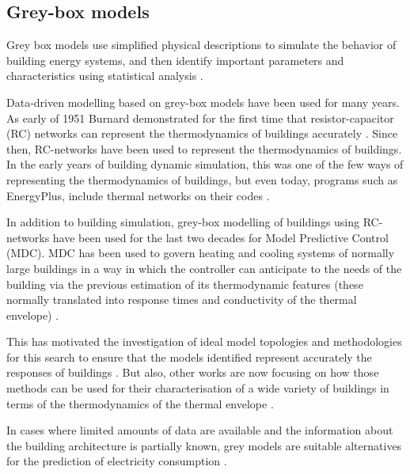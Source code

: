 \documentclass[10pt, conference, compsocconf]{IEEEtran}
\begin{document}
\subsection{Grey-box models}

Grey box models use simplified physical descriptions to simulate the behavior of building energy systems, and then identify important parameters and characteristics using statistical analysis \cite{handbook2017american}.

Data-driven modelling based on grey-box models have been used for many years. As early of 1951 Burnard demonstrated for the first time that resistor-capacitor (RC) networks can represent the thermodynamics of buildings accurately \cite{burnand1952study}. Since then, RC-networks have been used to represent the thermodynamics of buildings. In the early years of building dynamic simulation, this was one of the few ways of representing the thermodynamics of buildings, but even today, programs such as EnergyPlus, include thermal networks on their codes \cite{handbook2017american} .

In addition to building simulation, grey-box modelling of buildings using RC-networks have been used for the last two decades for Model Predictive Control (MDC). MDC has been used to govern heating and cooling systems of normally large buildings in a way in which the controller can anticipate to the needs of the building via the previous estimation of its thermodynamic features (these normally translated into response times and conductivity of the thermal envelope) \cite{coley1992second}.

This has motivated the investigation of ideal model topologies and methodologies for this search to ensure that the models identified represent accurately the responses of buildings \cite{bacher2011identifying}. But also, other works are now focusing on how those methods can be used for their characterisation of a wide variety of buildings in terms of the thermodynamics of the thermal envelope \cite{ramallo2017reliability}.

In cases where limited amounts of data are available and the information about the building architecture is partially known, grey models are suitable alternatives for the prediction of electricity consumption \cite{hamzacebi2014forecasting}.



\end{document}
